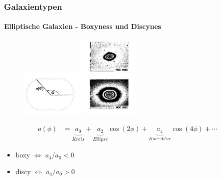 \begin{frame}
\frametitle{Galaxientypen}
\framesubtitle{Elliptische Galaxien - Boxyness und Discynes}


\begin{figure}
\begin{minipage}[hbt]{4cm}
	\centering
	\includegraphics[width=3cm]{boxi_diski_Schema.jpg}
\end{minipage}
%
\begin{minipage}[hbt]{4cm}
	\includegraphics[width=3cm]{boxi_diski_Bild.jpg}
\end{minipage}
\end{figure}


\begin{align*}
a(\phi) &= \underbrace{a_0}_{Kreis} + \underbrace{a_2}_{Ellipse} \cos(2 \phi) + \underbrace{a_4}_{Korrektur} \cos(4 \phi) + \cdots
\end{align*}

\begin{itemize}
\item boxy $\Leftrightarrow$ $a_4/a_0 < 0$ 
\item discy $\Leftrightarrow$ $a_4/a_0 > 0$
\end{itemize}


\end{frame}


